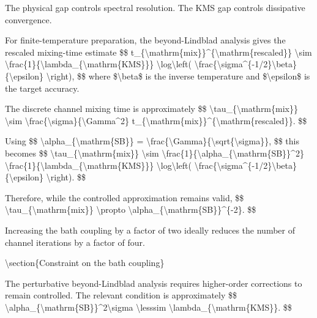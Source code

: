{The physical gap controls spectral resolution. The KMS gap controls
dissipative convergence.

For finite-temperature preparation, the beyond-Lindblad analysis gives
the rescaled mixing-time estimate
\$\$
t\_\{\textbackslash{}mathrm\{mix\}\}\textasciicircum{}\{\textbackslash{}mathrm\{rescaled\}\}
\textbackslash{}sim
\textbackslash{}frac\{1\}\{\textbackslash{}lambda\_\{\textbackslash{}mathrm\{KMS\}\}\}
\textbackslash{}log\textbackslash{}left(
\textbackslash{}frac\{\textbackslash{}sigma\textasciicircum{}\{-1/2\}\textbackslash{}beta\}\{\textbackslash{}epsilon\}
\textbackslash{}right),
\$\$
where \$\textbackslash{}beta\$ is the inverse temperature and \$\textbackslash{}epsilon\$ is the target
accuracy.

The discrete channel mixing time is approximately
\$\$
\textbackslash{}tau\_\{\textbackslash{}mathrm\{mix\}\}
\textbackslash{}sim
\textbackslash{}frac\{\textbackslash{}sigma\}\{\textbackslash{}Gamma\textasciicircum{}2\}
t\_\{\textbackslash{}mathrm\{mix\}\}\textasciicircum{}\{\textbackslash{}mathrm\{rescaled\}\}.
\$\$

Using
\$\$
\textbackslash{}alpha\_\{\textbackslash{}mathrm\{SB\}\}
=
\textbackslash{}frac\{\textbackslash{}Gamma\}\{\textbackslash{}sqrt\{\textbackslash{}sigma\}\},
\$\$
this becomes
\$\$
\textbackslash{}tau\_\{\textbackslash{}mathrm\{mix\}\}
\textbackslash{}sim
\textbackslash{}frac\{1\}\{\textbackslash{}alpha\_\{\textbackslash{}mathrm\{SB\}\}\textasciicircum{}2\}
\textbackslash{}frac\{1\}\{\textbackslash{}lambda\_\{\textbackslash{}mathrm\{KMS\}\}\}
\textbackslash{}log\textbackslash{}left(
\textbackslash{}frac\{\textbackslash{}sigma\textasciicircum{}\{-1/2\}\textbackslash{}beta\}\{\textbackslash{}epsilon\}
\textbackslash{}right).
\$\$

Therefore, while the controlled approximation remains valid,
\$\$
\textbackslash{}tau\_\{\textbackslash{}mathrm\{mix\}\}
\textbackslash{}propto
\textbackslash{}alpha\_\{\textbackslash{}mathrm\{SB\}\}\textasciicircum{}\{-2\}.
\$\$

Increasing the bath coupling by a factor of two ideally reduces the
number of channel iterations by a factor of four.

\textbackslash{}section\{Constraint on the bath coupling\}

The perturbative beyond-Lindblad analysis requires higher-order corrections
to remain controlled. The relevant condition is approximately
\$\$
\textbackslash{}alpha\_\{\textbackslash{}mathrm\{SB\}\}\textasciicircum{}2\textbackslash{}sigma
\textbackslash{}lesssim
\textbackslash{}lambda\_\{\textbackslash{}mathrm\{KMS\}\}.
\$\$

}
